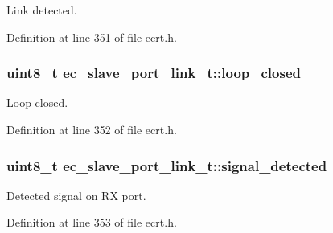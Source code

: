 \-Link detected. 



\-Definition at line 351 of file ecrt.\-h.

\subsubsection[{loop\-\_\-closed}]{\setlength{\rightskip}{0pt plus 5cm}uint8\-\_\-t {\bf ec\-\_\-slave\-\_\-port\-\_\-link\-\_\-t\-::loop\-\_\-closed}}\label{structec__slave__port__link__t_aefb5e82418479aa5f9043c9fe6503655}


\-Loop closed. 



\-Definition at line 352 of file ecrt.\-h.

\subsubsection[{signal\-\_\-detected}]{\setlength{\rightskip}{0pt plus 5cm}uint8\-\_\-t {\bf ec\-\_\-slave\-\_\-port\-\_\-link\-\_\-t\-::signal\-\_\-detected}}\label{structec__slave__port__link__t_a4ee187234a71d54517327aa02f076513}


\-Detected signal on \-R\-X port. 



\-Definition at line 353 of file ecrt.\-h.

